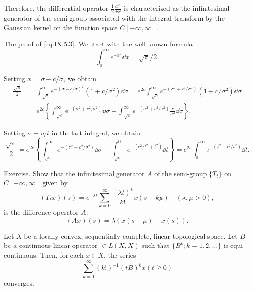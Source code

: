 Therefore, the differential operator $\frac{1}{2}\frac{a^{2}}{\dd s^{2}}$ is characterized as the infinitesimal generator of the semi-group associated with the integral transform by the Gaussian kernel on the function space $C[-\infty,\infty]$. 

The proof of \eqref{eq:IX.5.3}. We start with the well-known formula 
\[
\int_{0} ^{\infty} e ^ {- x ^{2}} \dd x = \sqrt {\pi} / 2.
\]

Setting $x = \sigma - c / \sigma$, we obtain 
\[
\begin{aligned}
\frac {\sqrt {\pi}}{2} &= \int_ {\sqrt {c}} ^{\infty} e ^ {- (\sigma - c / \sigma) ^{2}} (1 + c / \sigma^{2}) \dd \sigma = e ^{2c} \int_ {\sqrt {c}} ^{\infty} e ^ {- (\sigma^{2} + c ^{2} / \sigma^{2})} (1 + c / \sigma^{2}) \dd \sigma
\\
&= e ^{2c} \left\{\int_ {\sqrt {c}} ^{\infty} e ^ {- (\sigma^{2} + c ^{2} / \sigma^{2})} \dd \sigma + \int_ {\sqrt {c}} ^{\infty} e ^ {- (\sigma^{2} + c ^{2} / \sigma^{2})} \frac {c}{\sigma^{2}} \dd \sigma \right\}.
\end{aligned}
\]

Setting $\sigma = c / t$ in the last integral, we obtain 
\[
\frac {\sqrt {\pi}}{2} = e ^{2c} \left\{\int_ {\sqrt {c}} ^{\infty} e ^ {- (\sigma^{2} + c ^{2} / \sigma^{2})} \dd \sigma - \int_ {\sqrt {c}} ^{0} e ^ {- (c ^{2} / t ^{2} + t ^{2})} \dd t \right\} = e ^{2c} \int_{0} ^{\infty} e ^ {- (t ^{2} + c ^{2} / t ^{2})} \dd t.
\]

Exercise. Show that the infinitesimal generator $A$ of the semi-group $\{T_t\}$ on $C[-\infty, \infty]$ given by 
\[
(T _{t} x) (s) = e ^{- \lambda t} \sum\limits_{k=0} ^{\infty} \frac {(\lambda t) ^{k}}{k !} x (s - k \mu) \quad (\lambda , \mu > 0),
\]
is the difference operator $A$: 
\[
(A x) (s) = \lambda \left\{x (s - \mu) - x (s) \right\}.
\]


\label{sec:IX.6}

\begin{propositionu} Let $X$ be a locally convex, sequentially complete, linear topological space. Let $B$ be a continuous linear operator $\in L(X, X)$ such that $\{B^k; k = 1, 2, \ldots\}$ is equi-continuous. Then, for each $x \in X$, the series 
\begin{equation}\label{eq:IX.6.1}
\sum\limits_{k=0} ^{\infty} (k!) ^{-1} (t B) ^{k} x (t \geqq 0)
\end{equation}
converges. 
\end{propositionu}


